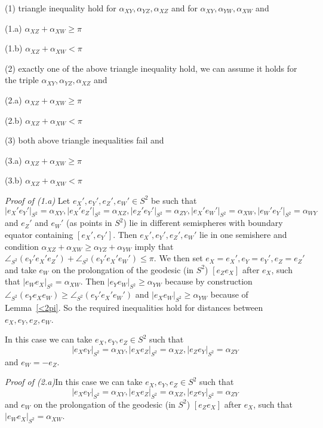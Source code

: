 \documentclass[a4paper,12pt]{article}
\theoremstyle{definition}
\theoremstyle{definition}
\theoremstyle{definition}
\begin{document}
(1) triangle inequality hold for $\alpha_{XY}, \alpha_{YZ}, \alpha_{XZ}$ and for
   $\alpha_{XY}, \alpha_{YW}, \alpha_{XW}$ and
   
   (1.a) $\alpha_{XZ}+\alpha_{XW}\ge\pi$   
     
     (1.b)      $\alpha_{XZ}+\alpha_{XW}<\pi$      
     
     (2) exactly one of the above triangle inequality hold,
     we can assume it holds for the triple $\alpha_{XY}, \alpha_{YZ}, \alpha_{XZ}$  and
     
     
   (2.a) $\alpha_{XZ}+\alpha_{XW}\ge\pi$   
     
     (2.b)      $\alpha_{XZ}+\alpha_{XW}<\pi$           
     
     (3) both  above triangle inequalities fail and    
     
   (3.a) $\alpha_{XZ}+\alpha_{XW}\ge\pi$   
     
     (3.b)      $\alpha_{XZ}+\alpha_{XW}<\pi$ 
            
\noindent
     {\it Proof of (1.a)}
     Let $e_X', e_Y',e_Z', e_W'\in S^2$ be such that
   $$|e_X'e_Y'|_{S^2}=\alpha_{XY}, |e_X'e_Z'|_{S^2}=\alpha_{XZ},   
   |e_Z'e_Y'|_{S^2}=\alpha_{ZY}, |e_X'e_W'|_{S^2}=\alpha_{XW}, |e_W'e_Y'|_{S^2}=\alpha_{WY}$$   
   and $e_Z'$ and $e_W'$ (as points in $S^2$) lie in different semispheres
   with boundary equator containing $[e_X',e_Y']$.
     Then $e_X', e_Y',e_Z', e_W'$ lie in one semishere and condition
     $\alpha_{XZ}+\alpha_{XW}\ge\alpha_{YZ}+\alpha_{YW}$     
     imply that $\angle_{S^2}(e_Y'e_X'e_Z')+\angle_{S^2}(e_Y'e_X'e_W')\le \pi$.
     We then set $e_X=e_X', e_Y=e_Y', e_Z=e_Z'$ and take $e_W$
      on the prolongation of the geodesic (in $S^2$) $[e_Ze_X]$ after $e_X$, such that 
     $|e_We_X|_{S^2}=\alpha_{XW}$.
     Then $|e_Ye_W|_{S^2}\ge\alpha_{YW}$
     because by construction $\angle_{S^2}(e_Ye_Xe_W)\ge\angle_{S^2}(e_Y'e_X'e_W')$
     and $|e_Xe_W|_{S^2}\ge\alpha_{YW}$ because of Lemma~\ref{<2pi}.     
        So the required inequalities hold for distances between
        $e_X, e_Y, e_Z, e_W$. 
        
        In this case we can take $e_X, e_Y,e_Z\in S^2$       
        such that   $$|e_Xe_Y|_{S^2}=\alpha_{XY}, |e_Xe_Z|_{S^2}=\alpha_{XZ},   
   |e_Ze_Y|_{S^2}=\alpha_{ZY}$$   and $e_W=-e_Z$.     
        
                     
\noindent
     {\it Proof of (2.a)}In this case we can take $e_X, e_Y,e_Z\in S^2$       
        such that   $$|e_Xe_Y|_{S^2}=\alpha_{XY}, |e_Xe_Z|_{S^2}=\alpha_{XZ},   
   |e_Ze_Y|_{S^2}=\alpha_{ZY}$$   and
$e_W$
      on the prolongation of the geodesic (in $S^2$) $[e_Ze_X]$ after $e_X$, such that 
     $|e_We_X|_{S^2}=\alpha_{XW}$.
     
\end{document}
